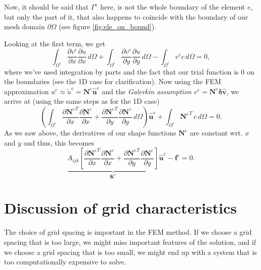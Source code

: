 \documentclass[acmtog]{acmart}
\begin{document}
Now, it should be said that $\Gamma^e$ here, is not the whole boundary of the element $e$, but only the part of it, that also happens to coincide with the boundary of our mesh domain $\partial\Omega$ (see figure \ref{fig:ele_on_bound}).

Looking at the first term, we get
%
\begin{equation}
  \int_{\Omega^e} \frac{ \partial v^e }{ \partial x }  \frac{ \partial u }{ \partial x } \, d\Omega + \int_{\Omega^e} \frac{ \partial v^e }{ \partial y }  \frac{ \partial u }{ \partial y } \, d\Omega - \int_{\Omega^e} v^e c \, d\Omega = 0,
\end{equation}
%
where we've used integration by parts and the fact that our trial function is 0 on the boundaries (see the 1D case for clarification).
Now using the FEM approximation $u^e \approx \tilde{u}^e = \boldsymbol N^e \boldsymbol{\hat{u}}^e$ and the \textit{Galerkin assumption}  $v^e = \boldsymbol N^e \boldsymbol{\delta \hat{v}}$, we arrive at (using the same steps as for the 1D case)
%
\begin{equation}
  \left(  \int_{\Omega^e} \frac{ \partial {{\boldsymbol N}^e}^T }{ \partial x } \frac{ \partial \boldsymbol N^e}{ \partial x } + \frac{ \partial {{\boldsymbol N}^e}^T }{ \partial y } \frac{ \partial \boldsymbol N^e}{ \partial y } \, d\Omega\right) \boldsymbol {\hat{u}}^e + \int_{\Omega^e} {{\boldsymbol N}^e}^T\, c \, d\Omega = 0.
\end{equation}
%
As we saw above, the derivatives of our shape functions $\boldsymbol N^e$ are constant wrt. $x$ and $y$ and thus, this becomes
%
\begin{equation}
  \underbrace{ A_{ijk} \left[  \frac{ \partial {{\boldsymbol N}^e}^T }{ \partial x } \frac{ \partial \boldsymbol N^e}{ \partial x } + \frac{ \partial {{\boldsymbol N}^e}^T }{ \partial y } \frac{ \partial \boldsymbol N^e}{ \partial y }\right] }_{ \boldsymbol K^e } \boldsymbol{\hat{u}}^e - \mathbf f^e = 0.
\end{equation}
%

\section{Discussion of grid characteristics}
The choice of grid spacing is important in the FEM method. If we choose a grid spacing that is too large, we might miss important features of the solution, and if we choose a grid spacing that is too small, we might end up with a system that is too computationally expensive to solve.
\end{document}
